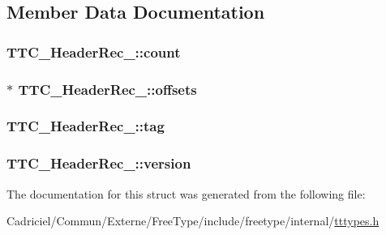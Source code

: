 \subsection{Member Data Documentation}
\hypertarget{struct_t_t_c___header_rec___a0bf5898e9d8c55bc74f51712a5ad1b58}{
\subsubsection[{count}]{ T\-T\-C\-\_\-\-Header\-Rec\-\_\-\-::count}}\label{struct_t_t_c___header_rec___a0bf5898e9d8c55bc74f51712a5ad1b58}
\hypertarget{struct_t_t_c___header_rec___a2ab33f787e8085d7086968fb931060b5}{
\subsubsection[{offsets}]{$\ast$ T\-T\-C\-\_\-\-Header\-Rec\-\_\-\-::offsets}}\label{struct_t_t_c___header_rec___a2ab33f787e8085d7086968fb931060b5}
\hypertarget{struct_t_t_c___header_rec___a7fc09906e402f8937b6ca207c84453b4}{
\subsubsection[{tag}]{ T\-T\-C\-\_\-\-Header\-Rec\-\_\-\-::tag}}\label{struct_t_t_c___header_rec___a7fc09906e402f8937b6ca207c84453b4}
\hypertarget{struct_t_t_c___header_rec___aa9ecb33279c68c3c00c1232441da5801}{
\subsubsection[{version}]{ T\-T\-C\-\_\-\-Header\-Rec\-\_\-\-::version}}\label{struct_t_t_c___header_rec___aa9ecb33279c68c3c00c1232441da5801}


The documentation for this struct was generated from the following file\-:\begin{DoxyCompactItemize}
\item 
Cadriciel/\-Commun/\-Externe/\-Free\-Type/include/freetype/internal/\hyperlink{tttypes_8h}{tttypes.\-h}\end{DoxyCompactItemize}
